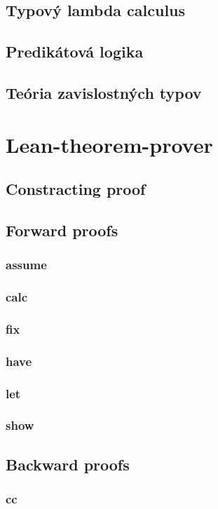 \documentclass[a4paper,10pt,oneside]{report}%
\begin{document}
\subsection{Typový lambda calculus}

\subsection{Predikátová logika}

\subsection{Teória zavislostných typov}

\section{Lean-theorem-prover}
\subsection{Constracting proof}
\subsection{Forward proofs}
    \subsubsection{assume}
    \subsubsection{calc}
    \subsubsection{fix}
    \subsubsection{have}
    \subsubsection{let}
    \subsubsection{show}
\subsection{Backward proofs}
    \subsubsection{cc}
\end{document}
